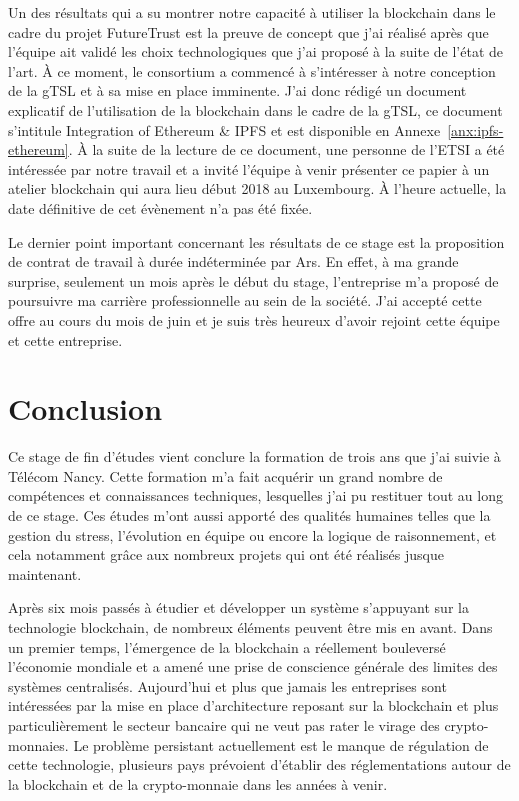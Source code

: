 \documentclass{tnreport}
\begin{document}
Un des résultats qui a su montrer notre capacité à utiliser la blockchain dans le cadre du projet FutureTrust est la preuve de concept que j'ai réalisé après que l'équipe ait validé les choix technologiques que j'ai proposé à la suite de l'état de l'art. À ce moment, le consortium a commencé à s'intéresser à notre conception de la gTSL et à sa mise en place imminente. J'ai donc rédigé un document explicatif de l'utilisation de la blockchain dans le cadre de la gTSL, ce document s'intitule Integration of Ethereum \& IPFS et est disponible en Annexe~\ref{anx:ipfs-ethereum}. À la suite de la lecture de ce document, une personne de l'ETSI a été intéressée par notre travail et a invité l'équipe à venir présenter ce papier à un atelier blockchain qui aura lieu début 2018 au Luxembourg. À l'heure actuelle, la date définitive de cet évènement n'a pas été fixée.

Le dernier point important concernant les résultats de ce stage est la proposition de contrat de travail à durée indéterminée par Ar{\texteta}s. En effet, à ma grande surprise, seulement un mois après le début du stage, l'entreprise m'a proposé de poursuivre ma carrière professionnelle au sein de la société. J'ai accepté cette offre au cours du mois de juin et je suis très heureux d'avoir rejoint cette équipe et cette entreprise.

\chapter{Conclusion}

Ce stage de fin d'études vient conclure la formation de trois ans que j'ai suivie à Télécom Nancy. Cette formation m'a fait acquérir un grand nombre de compétences et connaissances techniques, lesquelles j'ai pu restituer tout au long de ce stage. Ces études m'ont aussi apporté des qualités humaines telles que la gestion du stress, l'évolution en équipe ou encore la logique de raisonnement, et cela notamment grâce aux nombreux projets qui ont été réalisés jusque maintenant.

Après six mois passés à étudier et développer un système s'appuyant sur la technologie blockchain, de nombreux éléments peuvent être mis en avant. Dans un premier temps, l'émergence de la blockchain a réellement bouleversé l'économie mondiale et a amené une prise de conscience générale des limites des systèmes centralisés. Aujourd'hui et plus que jamais les entreprises sont intéressées par la mise en place d'architecture reposant sur la blockchain et plus particulièrement le secteur bancaire qui ne veut pas rater le virage des crypto-monnaies. Le problème persistant actuellement est le manque de régulation de cette technologie, plusieurs pays prévoient d'établir des réglementations autour de la blockchain et de la crypto-monnaie dans les années à venir.
\end{document}
